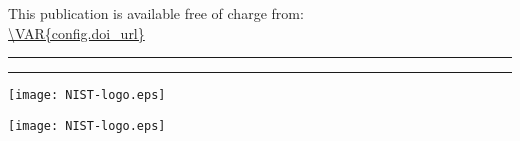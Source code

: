 \begin{titlepage}
\begin{flushright}

	\tagpdfparaOn

\large {}
\vfill
\normalsize This publication is available free of charge from:\\
\url{\VAR{config.doi_url}}\\
\vfill
\hrule \relax
\vspace{-15pt}
\begin{center}
	\large{
	\hspace{7pt}
	}
\end{center}
\vspace{-5pt}
\hrule \relax
\vfill

	\texttt{[image: NIST-logo.eps]}\\
	\tagmcend\tagstructend

	\texttt{[image: NIST-logo.eps]}\\



\end{flushright}
\end{titlepage}





